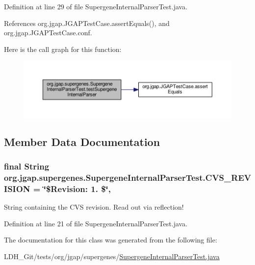 Definition at line 29 of file Supergene\-Internal\-Parser\-Test.\-java.



References org.\-jgap.\-J\-G\-A\-P\-Test\-Case.\-assert\-Equals(), and org.\-jgap.\-J\-G\-A\-P\-Test\-Case.\-conf.



Here is the call graph for this function\-:
\nopagebreak
\begin{figure}[H]
\begin{center}
\leavevmode
\includegraphics[width=350pt]{classorg_1_1jgap_1_1supergenes_1_1_supergene_internal_parser_test_aa94a9a335c128bd9ede39479889df217_cgraph}
\end{center}
\end{figure}




\subsection{Member Data Documentation}
\hypertarget{classorg_1_1jgap_1_1supergenes_1_1_supergene_internal_parser_test_a1625d6d0f39826b53254042aa6644b07}{
\subsubsection[{C\-V\-S\-\_\-\-R\-E\-V\-I\-S\-I\-O\-N}]{\setlength{\rightskip}{0pt plus 5cm}final String org.\-jgap.\-supergenes.\-Supergene\-Internal\-Parser\-Test.\-C\-V\-S\-\_\-\-R\-E\-V\-I\-S\-I\-O\-N = \char`\"{}\$Revision\-: 1. \$\char`\"{}\hspace{0.3cm}{\ttfamily [static]}, {\ttfamily [private]}}}\label{classorg_1_1jgap_1_1supergenes_1_1_supergene_internal_parser_test_a1625d6d0f39826b53254042aa6644b07}
String containing the C\-V\-S revision. Read out via reflection! 

Definition at line 21 of file Supergene\-Internal\-Parser\-Test.\-java.



The documentation for this class was generated from the following file\-:\begin{DoxyCompactItemize}
\item 
L\-D\-H\-\_\-\-Git/tests/org/jgap/supergenes/\hyperlink{_supergene_internal_parser_test_8java}{Supergene\-Internal\-Parser\-Test.\-java}\end{DoxyCompactItemize}
